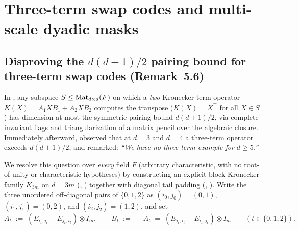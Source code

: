\section{Three-term swap codes and multi-scale dyadic masks}\label{sec:swapcodes}

\subsection{Disproving the \texorpdfstring{$d(d+1)/2$}{d(d+1)/2} pairing bound for three-term swap codes (Remark~5.6)}\label{sec:remark-5-6}

In \cite[Theorem~5.1 and Corollary~5.5]{SeventeenthPaper2026}, any subspace
$S \le \operatorname{Mat}_{d\times d}(F)$ on which a \emph{two}-Kronecker-term operator
$K(X) = A_1 X B_1 + A_2 X B_2$ computes the transpose ($K(X) = X^\top$ for all $X \in S$) has
dimension at most the symmetric pairing bound $d(d+1)/2$, via complete invariant flags and
triangularization of a matrix pencil over the algebraic closure. Immediately afterward,
\cite[Remark~5.6]{SeventeenthPaper2026} observed
that at $d = 3$ and $d = 4$ a three-term operator exceeds $d(d+1)/2$, and remarked:
\emph{``We have no three-term example for $d \ge 5$.''}

We resolve this question over \emph{every} field $F$ (arbitrary characteristic, with no root-of-unity
or characteristic hypotheses) by constructing an explicit block-Kronecker family $K_{3m}$ on
$d = 3m$ (, ) together with diagonal tail padding
(, ). Write the three unordered off-diagonal pairs of
$\{0,1,2\}$ as $(i_0,j_0) = (0,1)$, $(i_1,j_1) = (0,2)$, and $(i_2,j_2) = (1,2)$, and set
\[
  A_t \;:=\; (E_{i_t, j_t} - E_{j_t, i_t}) \otimes I_m,
  \qquad
  B_t \;:=\; -A_t \;=\; (E_{j_t, i_t} - E_{i_t, j_t}) \otimes I_m
  \qquad (t \in \{0,1,2\}).
\]

